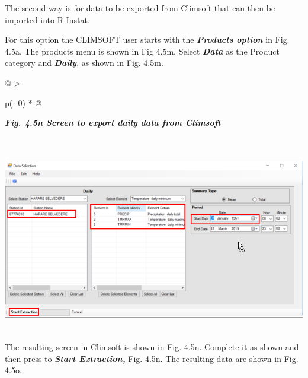 \documentclass[
  letterpaper,
  DIV=11,
  numbers=noendperiod]{scrreprt}
\begin{document}
The second way is for data to be exported from Climsoft that can then be
imported into R-Instat.

For this option the CLIMSOFT user starts with the \textbf{\emph{Products
option}} in Fig. 4.5a. The products menu is shown in Fig 4.5m. Select
\textbf{\emph{Data}} as the Product category and \textbf{\emph{Daily}},
as shown in Fig. 4.5m.

\begin{longtable}[]{@{}
  >{\raggedright\arraybackslash}p{(\columnwidth - 0\tabcolsep) * }@{}}
\toprule\noalign{}
\begin{minipage}[b]{\linewidth}\raggedright
\textbf{\emph{Fig. 4.5n Screen to export daily data from Climsoft}}
\end{minipage} \\
\midrule\noalign{}
\endhead
\bottomrule\noalign{}
\endlastfoot
\includegraphics[width=6.1309in,height=3.18939in]{figures/Fig4.5n.png} \\
\end{longtable}

The resulting screen in Climsoft is shown in Fig. 4.5n. Complete it as
shown and then press to \textbf{\emph{Start Extraction,}} Fig. 4.5n. The
resulting data are shown in Fig. 4.5o.
\end{document}

